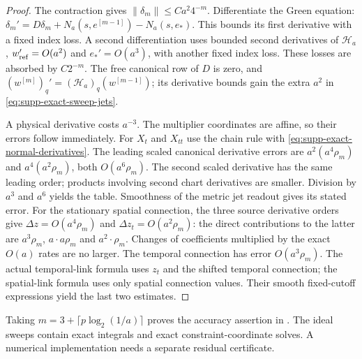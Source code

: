 \documentclass[11pt]{article}
\numberwithin{equation}{section}
\theoremstyle{definition}
\theoremstyle{remark}
\begin{document}
\begin{proof}
The contraction gives $\|\delta_m\|\le Ca^2 4^{-m}$. Differentiate the
Green equation:
$\delta_m'=D\delta_m+N_a(s,e^{[m-1]})-N_a(s,e_*)$.
This bounds its first derivative with a fixed index loss. A second
differentiation uses bounded second derivatives of $\mathcal H_a$,
$w_{\rm ref}'=O(a^2)$ and $e_*'=O(a^3)$, with another fixed index loss.
These losses are absorbed by $C2^{-m}$. The free canonical row of $D$ is
zero, and $(w^{[m]})_q'=(\mathcal H_a)_q(w^{[m-1]})$; its derivative
bounds gain the extra $a^2$ in \eqref{eq:supp-exact-sweep-jets}.

A physical derivative costs $a^{-3}$. The multiplier coordinates are affine,
so their errors follow immediately. For $X_t$ and $X_{tt}$ use the chain
rule with \eqref{eq:supp-exact-normal-derivatives}. The leading scaled
canonical derivative errors are $a^2(a^4\rho_m)$ and
$a^4(a^2\rho_m)$, both $O(a^6\rho_m)$. The second scaled derivative has
the same leading order; products involving second chart derivatives are
smaller. Division by $a^3$ and $a^6$ yields the table.
Smoothness of the metric jet readout gives its stated error. For the
stationary spatial connection, the three source derivative orders give
$\Delta z=O(a^4\rho_m)$ and
$\Delta z_t=O(a^2\rho_m)$: the direct contributions to the latter are
$a^3\rho_m$, $a\cdot a\rho_m$ and $a^2\cdot\rho_m$.
Changes of coefficients multiplied by the exact $O(a)$ rates are no larger.
The temporal connection has error $O(a^3\rho_m)$. The actual temporal-link
formula uses $z_t$ and the shifted temporal connection; the spatial-link
formula uses only spatial connection values. Their smooth fixed-cutoff
expressions yield the last two estimates.
\end{proof}

Taking $m=3+\lceil p\log_2(1/a)\rceil$ proves the accuracy assertion in
. The ideal sweeps contain exact integrals and
exact constraint-coordinate solves. A numerical implementation needs a
separate residual certificate.
\end{document}
